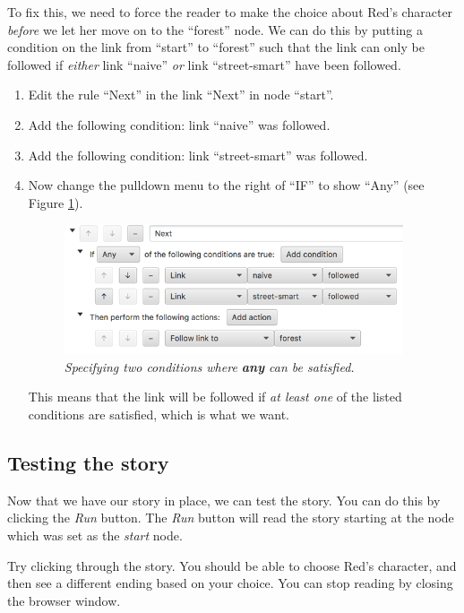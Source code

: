 \documentclass{article}
\begin{document}
To fix this, we need to force the reader to make the choice about Red's character \textit{before} we let her move on to the ``forest'' node. We can do this by putting a condition on the link from ``start'' to ``forest'' such that the link can only be followed if \textit{either} link ``naive'' \textit{or} link ``street-smart'' have been followed.

\begin{enumerate}
  \item Edit the rule ``Next'' in the link ``Next'' in node ``start''.
  \item Add the following condition: link ``naive'' was followed.
  \item Add the following condition: link ``street-smart'' was followed.
  \item Now change the pulldown menu to the right of ``IF'' to show ``Any'' (see Figure \ref{fig:tut2:any_condition}).

\begin{figure}[h]
  \centering
  \includegraphics[width=10cm]{images/hypedyn-tutorial-2-figure-7}
  \caption{\textit{Specifying two conditions where \textbf{any} can be
  satisfied.}}
  \label{fig:tut2:any_condition}
\end{figure} 

This means that the link will be followed if \textit{at least one} of the listed conditions are satisfied, which is what we want.

\end{enumerate}

\subsection{Testing the story}

Now that we have our story in place, we can test the story. You can do this by clicking the \textit{Run} button. The \textit{Run} button will read the story starting at the node which was set as the \textit{start} node.

Try clicking through the story. You should be able to choose Red's character, and then see a different ending based on your choice. You can stop reading by closing the browser window.
\end{document}
